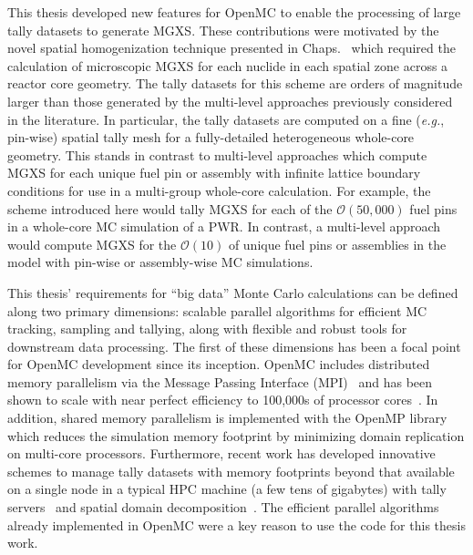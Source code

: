 This thesis developed new features for OpenMC to enable the processing of large tally datasets to generate \ac{MGXS}. These contributions were motivated by the novel spatial homogenization technique presented in 
Chaps.~ which required the calculation of microscopic \ac{MGXS} for each nuclide in each spatial zone across a reactor core geometry. The tally datasets for this scheme are orders of magnitude larger than those generated by the multi-level approaches previously considered in the literature. In particular, the tally datasets are computed on a fine (\textit{e.g.}, pin-wise) spatial tally mesh for a fully-detailed heterogeneous whole-core geometry. This stands in contrast to multi-level approaches which compute \ac{MGXS} for each unique fuel pin or assembly with infinite lattice boundary conditions for use in a multi-group whole-core calculation. For example, the scheme introduced here would tally \ac{MGXS} for each of the $\mathcal{O}(50,000)$ fuel pins in a whole-core \ac{MC} simulation of a \ac{PWR}. In contrast, a multi-level approach would compute \ac{MGXS} for the $\mathcal{O}(10)$ of unique fuel pins or assemblies in the model with pin-wise or assembly-wise \ac{MC} simulations.

This thesis' requirements for ``big data'' Monte Carlo calculations can be defined along two primary dimensions: scalable parallel algorithms for efficient \ac{MC} tracking, sampling and tallying, along with flexible and robust tools for downstream data processing. The first of these dimensions has been a focal point for OpenMC development since its inception. OpenMC includes distributed memory parallelism via the Message Passing Interface (MPI)~\cite{gropp1996mpi} and has been shown to scale with near perfect efficiency to 100,000s of processor cores~\cite{romano2013parallel}. In addition, shared memory parallelism is implemented with the OpenMP library~\cite{siegel2014multi} which reduces the simulation memory footprint by minimizing domain replication on multi-core processors. Furthermore, recent work has developed innovative schemes to manage tally datasets with memory footprints beyond that available on a single node in a typical \ac{HPC} machine (a few tens of gigabytes) with tally servers~\cite{romano2013servers} and spatial domain decomposition~\cite{horelik2014dd}. The efficient parallel algorithms already implemented in OpenMC were a key reason to use the code for this thesis work.

